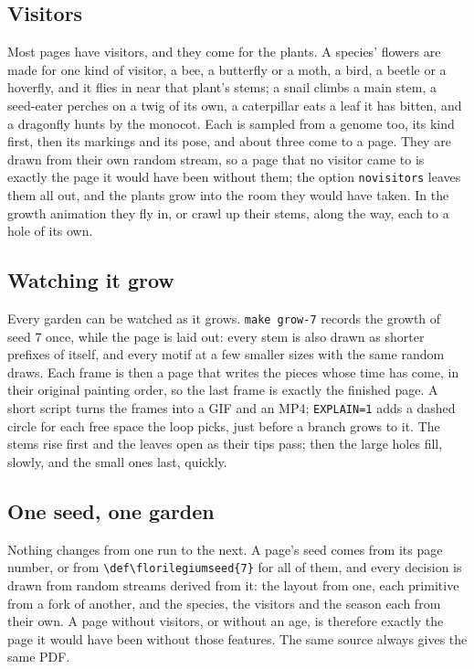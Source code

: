 \documentclass[11pt,a4paper]{article}
\newcommand\code[1]{\texttt{\small #1}}
\begin{document}
\subsection{Visitors}

Most pages have visitors, and they come for the plants. A species' flowers are made for one
kind of visitor, a bee, a butterfly or a moth, a bird, a beetle or a hoverfly, and it flies in
near that plant's stems; a snail climbs a main stem, a seed-eater perches on a twig of its own,
a caterpillar eats a leaf it has bitten, and a dragonfly hunts by the monocot. Each is sampled
from a genome too, its kind first, then its markings and its pose, and about three come to a
page. They are drawn from their own random stream, so a page that no visitor came to is exactly
the page it would have been without them; the option \code{novisitors} leaves them all out, and
the plants grow into the room they would have taken. In the growth
animation they fly in, or crawl up their stems, along the way, each to a hole of its own.

\subsection{Watching it grow}

Every garden can be watched as it grows. \code{make grow-7} records the growth of seed 7
once, while the page is laid out: every stem is also drawn as shorter prefixes of itself,
and every motif at a few smaller sizes with the same random draws. Each frame is then a
page that writes the pieces whose time has come, in their original painting order, so the
last frame is exactly the finished page. A short script turns the frames into a GIF and an
MP4; \code{EXPLAIN=1} adds a dashed circle for each free space the loop picks, just before
a branch grows to it. The stems rise first and the leaves open as their tips pass; then
the large holes fill, slowly, and the small ones last, quickly.

\subsection{One seed, one garden}

Nothing changes from one run to the next. A page's seed comes from its page number, or
from \code{\textbackslash def\textbackslash florilegiumseed\{7\}} for all of them, and
every decision is drawn from random streams derived from it: the layout from one, each
primitive from a fork of another, and the species, the visitors and the season each from
their own.
A page without visitors, or without an age, is therefore exactly the page it would have
been without those features. The same source always gives the same PDF.
\end{document}
